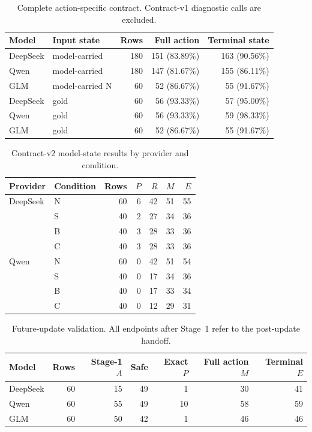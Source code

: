 \documentclass[11pt]{article}
\newcommand{\Rsupport}{R}
\newcommand{\Pstrict}{P}
\newcommand{\Maction}{M}
\newcommand{\Eoutcome}{E}
\begin{document}
\begin{table}[h]
\centering
\caption{Complete action-specific contract. Contract-v1 diagnostic calls are excluded.}
\label{tab:contract_v2}
\small
\begin{tabular}{@{}llrrr@{}}
\toprule
Model & Input state & Rows & Full action & Terminal state \\
\midrule
DeepSeek & model-carried & 180 & 151 (83.89\%) & 163 (90.56\%) \\
Qwen & model-carried & 180 & 147 (81.67\%) & 155 (86.11\%) \\
GLM & model-carried N & 60 & 52 (86.67\%) & 55 (91.67\%) \\
DeepSeek & gold & 60 & 56 (93.33\%) & 57 (95.00\%) \\
Qwen & gold & 60 & 56 (93.33\%) & 59 (98.33\%) \\
GLM & gold & 60 & 52 (86.67\%) & 55 (91.67\%) \\
\bottomrule
\end{tabular}
\end{table}

\begin{table}[h]
\centering
\caption{Contract-v2 model-state results by provider and condition.}
\label{tab:condition_v2}
\small
\begin{tabular}{@{}llrrrrr@{}}
\toprule
Provider & Condition & Rows & \(\Pstrict\) & \(\Rsupport\) & \(\Maction\) & \(\Eoutcome\) \\
\midrule
DeepSeek & N & 60 & 6 & 42 & 51 & 55 \\
 & S & 40 & 2 & 27 & 34 & 36 \\
 & B & 40 & 3 & 28 & 33 & 36 \\
 & C & 40 & 3 & 28 & 33 & 36 \\
Qwen & N & 60 & 0 & 42 & 51 & 54 \\
 & S & 40 & 0 & 17 & 34 & 36 \\
 & B & 40 & 0 & 17 & 33 & 34 \\
 & C & 40 & 0 & 12 & 29 & 31 \\
\bottomrule
\end{tabular}
\end{table}

\begin{table}[h]
\centering
\caption{Future-update validation. All endpoints after Stage~1 refer to the post-update handoff.}
\label{tab:future}
\small
\begin{tabular}{@{}lrrrrrr@{}}
\toprule
Model & Rows & Stage-1 \(A\) & Safe & Exact \(\Pstrict\) & Full action \(\Maction\) & Terminal \(\Eoutcome\) \\
\midrule
DeepSeek & 60 & 15 & 49 & 1 & 30 & 41 \\
Qwen & 60 & 55 & 49 & 10 & 58 & 59 \\
GLM & 60 & 50 & 42 & 1 & 46 & 46 \\
\bottomrule
\end{tabular}
\end{table}
\end{document}
